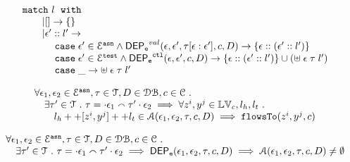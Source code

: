 \begin{defn}
\[\begin{array}{l}
	\ematch~  l ~ \ewith
	\\ \qquad
	| [] \to \{\}
	\\ \qquad
	|  \event' :: l' \to  
	\\ \quad \qquad 	
	\ecase \event' \in \eventset^{\asn}  \land \eventdep^{val}(\event, \event', \trace[\event:\event'], c, D)
	\to \left\{ \event::(\event' :: l') \right\}
	\\ \quad \qquad 	
	\ecase \event' \in \eventset^{\test} \land \eventdep^{\ctl}(\event, \event', c, D)
	\to \left\{ \event::(\event' :: l') \right\}\cup 
	\left( \uplus \eapp  \event  \eapp \trace  \eapp l' \right)
	\\ \quad \qquad 	
	\ecase \_ \to \uplus \eapp  \event  \eapp \trace  \eapp l'  
\end{array}
\]
\end{defn}
%
\begin{thm}
\label{thm:alg_correct}
\[
\begin{array}{l}
  \forall \mathtt{\epsilon}_1, \mathtt{\epsilon}_2 \in \mathcal{E}^{\mathtt{{asn}}}, \mathtt{\tau} \in \mathcal{T}, D \in \mathcal{DB} , c \in \mathcal{C} ~.~
  \\ \quad 
   \exists \mathtt{\tau}' \in \mathcal{T} ~.~ \mathtt{\tau} = \cdot \mathtt{\epsilon}_1 \smallfrown \mathtt{\tau}' \cdot \mathtt{\epsilon}_2
   \implies    \forall  z^i, y^j \in \mathbb{LV}_c, l_h, l_t ~.~ 
  \\ \qquad 
   l_h ++ [z^i, y^j] ++ l_t \in \mathcal{A}(\mathtt{\epsilon}_1, \mathtt{\epsilon}_2, \mathtt{\tau}, c, D)
   \implies \mathtt{flowsTo}(z^i, y^j, c)
\end{array}
\]
\end{thm}
%
%
\begin{thm}
\label{thm:algeventdep_sound}
\[
\begin{array}{l}
  \forall \mathtt{\epsilon}_1, \mathtt{\epsilon}_2 \in \mathcal{E}^{\mathtt{{asn}}}, \mathtt{\tau} \in \mathcal{T}, D \in \mathcal{DB} , c \in \mathcal{C} ~.~
  \\ \quad 
   \exists \mathtt{\tau}' \in \mathcal{T} ~.~ \mathtt{\tau} = \cdot \mathtt{\epsilon}_1 \smallfrown \mathtt{\tau}' \cdot \mathtt{\epsilon}_2
  \implies \mathsf{DEP_{\mathtt{e}}}(\mathtt{\epsilon}_1, \mathtt{\epsilon}_2, \mathtt{\tau}, {c}, D)
   \implies
   \mathcal{A}(\mathtt{\epsilon}_1, \mathtt{\epsilon}_2, \mathtt{\tau}, c, D) \neq \emptyset
\end{array}
\]
\end{thm}
%
